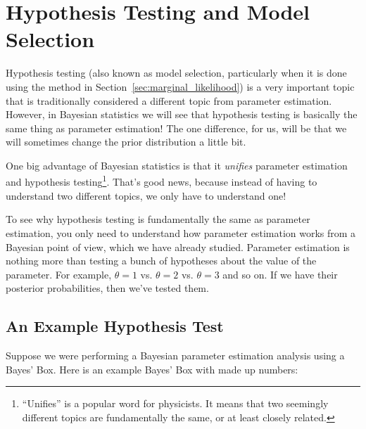 \chapter{Hypothesis Testing and Model Selection}
Hypothesis testing (also known as model selection, particularly when it is
done using the method in Section~\ref{sec:marginal_likelihood})
is a very important topic that is traditionally considered
a different topic from parameter estimation. However, in Bayesian statistics
we will see that hypothesis testing is basically the same thing as parameter
estimation! The one difference, for us, will be that we will sometimes change
the prior distribution a little bit.

One big advantage of Bayesian statistics is that it {\it unifies}
parameter estimation and hypothesis
testing\footnote{``Unifies'' is a popular word for physicists. It means that
two seemingly different topics are fundamentally the same, or at least closely
related.}. That's good news, because instead of having to
understand two different topics, we only have to understand one!

To see why hypothesis testing is fundamentally the same as parameter estimation,
you only need to
understand how parameter estimation works from a Bayesian point of view, which
we have already studied.
Parameter estimation is nothing more than testing a bunch of hypotheses about
the value of the parameter. For example, $\theta=1$ vs. $\theta=2$ vs. $\theta=3$ and
so on. If we have their posterior probabilities, then we've tested them.

\section{An Example Hypothesis Test}
Suppose we were performing a Bayesian parameter estimation analysis using a
Bayes' Box. Here is an example Bayes' Box with made up numbers:

